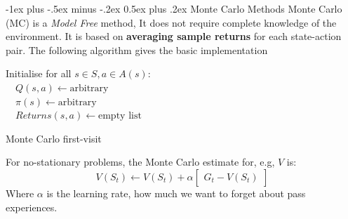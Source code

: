 \documentclass[10pt,landscape]{article}
\makeatletter
\renewcommand{\section}{\@startsection{section}{1}{0mm}%
                                {-1ex plus -.5ex minus -.2ex}%
                                {0.5ex plus .2ex}%
                                {\normalfont\large\bfseries}}
\makeatother
\begin{document}
\begin{multicols}{2}
\section{Monte Carlo Methods}
Monte Carlo (MC) is a \emph{Model Free} method, It does not require complete knowledge of the environment. It is based on \textbf{averaging sample returns} for each state-action pair. The following algorithm gives the basic implementation

\begin{algorithm}[H]
 Initialise for all $s \in S, a \in A(s):$ \\
	$\quad Q(s,a) \leftarrow \text{arbitrary}$ \\
	$\quad \pi(s) \leftarrow \text{arbitrary}$ \\
	$\quad Returns(s,a) \leftarrow \text{empty list}$ \\

\caption{Monte Carlo first-visit }
\end{algorithm}
For no-stationary problems, the Monte Carlo estimate for, e.g, $V$ is:
\begin{equation}
V(S_t) \leftarrow V(S_t) + \alpha \begin{bmatrix}
	G_t - V(S_t)
\end{bmatrix}
\end{equation}
Where $\alpha$ is the learning rate, how much we want to forget about pass experiences.

\end{multicols}
\end{document}
